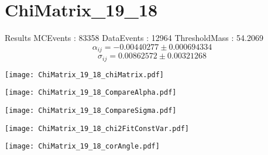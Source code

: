 \documentclass[a4paper,12pt]{article}
\begin{document}
\section{ChiMatrix\_19\_18}
\begin{minipage}{0.49\linewidth} Results \newline
MCEvents : 83358\newline
DataEvents : 12964 \newline
ThresholdMass : 54.2069\\
$$\alpha_{ij} = -0.00440277\pm 0.000694334$$
$$\sigma_{ij} = 0.00862572\pm 0.00321268$$
\end{minipage}\hfill
\begin{minipage}{0.49\linewidth} 
\texttt{[image: ChiMatrix\_19\_18\_chiMatrix.pdf]}\\
\end{minipage}
\hfill
\begin{minipage}{0.49\linewidth} 
\texttt{[image: ChiMatrix\_19\_18\_CompareAlpha.pdf]}\\
\end{minipage}
\hfill
\begin{minipage}{0.49\linewidth} 
\texttt{[image: ChiMatrix\_19\_18\_CompareSigma.pdf]}\\
\end{minipage}
\begin{minipage}{0.49\linewidth} 
\texttt{[image: ChiMatrix\_19\_18\_chi2FitConstVar.pdf]}\\
\end{minipage}
\hfill
\begin{minipage}{0.49\linewidth} 
\texttt{[image: ChiMatrix\_19\_18\_corAngle.pdf]}\\
\end{minipage}
\end{document}
